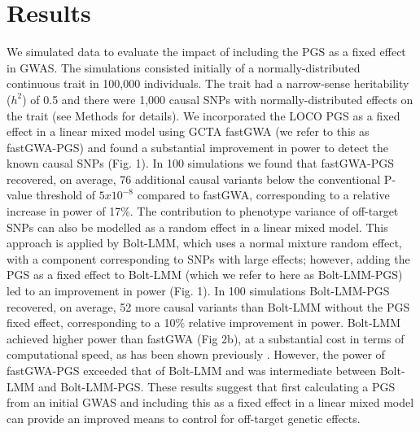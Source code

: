 \documentclass[fleqn,10pt]{wlscirep}
\begin{document}
\section*{Results}

We simulated data to evaluate the impact of including the PGS as a fixed effect in GWAS. The simulations consisted initially of a normally-distributed continuous trait in 100,000 individuals. The trait had a narrow-sense heritability ($h^2$) of 0.5 and there were 1,000 causal SNPs with normally-distributed effects on the trait (see Methods for details). We incorporated the LOCO PGS as a fixed effect in a linear mixed model using GCTA fastGWA \cite{jiang2019resource} (we refer to this as fastGWA-PGS) and found a substantial improvement in power to detect the known causal SNPs (Fig. 1). In 100 simulations we found that fastGWA-PGS recovered, on average, 76 additional causal variants below the conventional P-value threshold of $5x10^{-8}$ compared to fastGWA, corresponding to a relative increase in power of 17\%. The contribution to phenotype variance of off-target SNPs can also be modelled as a random effect in a linear mixed model. This approach is applied by Bolt-LMM, which uses a normal mixture random effect, with a component corresponding to SNPs with large effects; however, adding the PGS as a fixed effect to Bolt-LMM (which we refer to here as Bolt-LMM-PGS) led to an improvement in power (Fig. 1). In 100 simulations Bolt-LMM-PGS recovered, on average, 52 more causal variants than Bolt-LMM without the PGS fixed effect, corresponding to a 10\% relative improvement in power. Bolt-LMM achieved higher power than fastGWA (Fig 2b), at a substantial cost in terms of computational speed, as has been shown previously \cite{jiang2019resource}. However, the power of fastGWA-PGS exceeded that of Bolt-LMM and was intermediate between Bolt-LMM and Bolt-LMM-PGS. These results suggest that first calculating a PGS from an initial GWAS and including this as a fixed effect in a linear mixed model can provide an improved means to control for off-target genetic effects.  \par 
\end{document}
